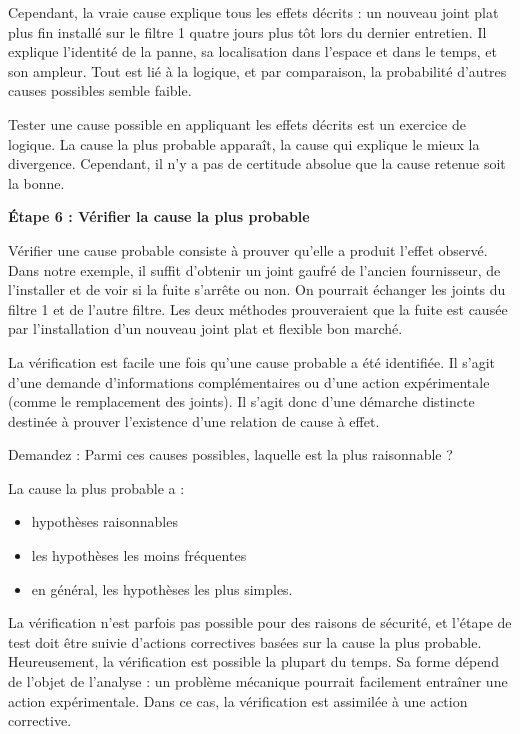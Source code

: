 Cependant, la vraie cause explique tous les effets décrits : un nouveau joint plat plus fin installé sur le filtre 1 quatre jours plus tôt lors du dernier entretien. Il explique l'identité de la panne, sa localisation dans l'espace et dans le temps, et son ampleur. Tout est lié à la logique, et par comparaison, la probabilité d'autres causes possibles semble faible.
\vspace{0.3cm}

Tester une cause possible en appliquant les effets décrits est un exercice de logique. La cause la plus probable apparaît, la cause qui explique le mieux la divergence. Cependant, il n'y a pas de certitude absolue que la cause retenue soit la bonne.
\vspace{0.3cm}

\textbf{	Étape 6 : Vérifier la cause la plus probable}
\vspace{0.3cm}

Vérifier une cause probable consiste à prouver qu'elle a produit l'effet observé.
Dans notre exemple, il suffit d'obtenir un joint gaufré de l'ancien fournisseur, de l'installer et de voir si la fuite s'arrête ou non. On pourrait échanger les joints du filtre 1 et de l'autre filtre. Les deux méthodes prouveraient que la fuite est causée par l'installation d'un nouveau joint plat et flexible bon marché.
\vspace{0.3cm}

La vérification est facile une fois qu'une cause probable a été identifiée. Il s'agit d'une demande d'informations complémentaires ou d'une action expérimentale (comme le remplacement des joints). Il s'agit donc d'une démarche distincte destinée à prouver l'existence d'une relation de cause à effet.
\vspace{0.3cm}

Demandez : Parmi ces causes possibles, laquelle est la plus raisonnable ?
\vspace{0.3cm}


La cause la plus probable a :
\begin{itemize}
\item 	hypothèses raisonnables
\item 	les hypothèses les moins fréquentes
\item en 	général, les hypothèses les plus simples.
\end{itemize} 


La vérification n'est parfois pas possible pour des raisons de sécurité, et l'étape de test doit être suivie d'actions correctives basées sur la cause la plus probable.
Heureusement, la vérification est possible la plupart du temps. Sa forme dépend de l'objet de l'analyse : un problème mécanique pourrait facilement entraîner une action expérimentale. Dans ce cas, la vérification est assimilée à une action corrective.


